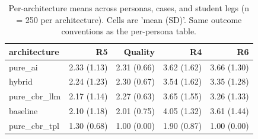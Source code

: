 \begin{table}[htbp]
\centering
\caption{Per-architecture means across personas, cases, and student legs (n = 250 per architecture). Cells are 'mean (SD)'. Same outcome conventions as the per-persona table.}
\label{tab:per-arch-means}
\begin{tabular}{lrrrr}
\toprule
architecture & R5 & Quality & R4 & R6 \\
\midrule
pure\_ai & 2.33 (1.13) & 2.31 (0.66) & 3.62 (1.62) & 3.66 (1.30) \\
hybrid & 2.24 (1.23) & 2.30 (0.67) & 3.54 (1.62) & 3.35 (1.28) \\
pure\_cbr\_llm & 2.17 (1.14) & 2.27 (0.63) & 3.65 (1.55) & 3.26 (1.33) \\
baseline & 2.10 (1.18) & 2.01 (0.75) & 4.05 (1.32) & 3.61 (1.44) \\
pure\_cbr\_tpl & 1.30 (0.68) & 1.00 (0.00) & 1.90 (0.87) & 1.00 (0.00) \\
\bottomrule
\end{tabular}
\end{table}
